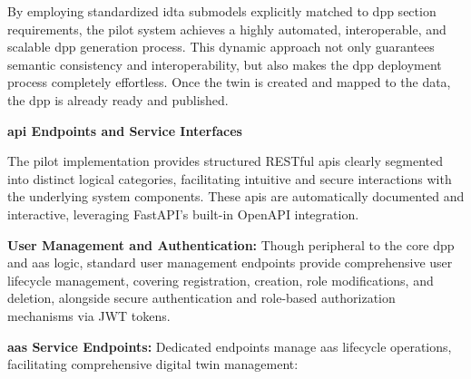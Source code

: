 By employing standardized \ac{idta} submodels explicitly matched to \ac{dpp} section requirements, the pilot system achieves a highly automated, interoperable, and scalable \ac{dpp} generation process. This dynamic approach not only guarantees semantic consistency and interoperability, but also makes the \ac{dpp} deployment process completely effortless. Once the twin is created and mapped to the data, the \ac{dpp} is already ready and published.

\textbf{\ac{api} Endpoints and Service Interfaces}

The pilot implementation provides structured RESTful \ac{api}s clearly segmented into distinct logical categories, facilitating intuitive and secure interactions with the underlying system components. These \ac{api}s are automatically documented and interactive, leveraging FastAPI’s built-in OpenAPI integration.

\textbf{User Management and Authentication:}
Though peripheral to the core \ac{dpp} and \ac{aas} logic, standard user management endpoints provide comprehensive user lifecycle management, covering registration, creation, role modifications, and deletion, alongside secure authentication and role-based authorization mechanisms via JWT tokens.

\textbf{\ac{aas} Service Endpoints:}
Dedicated endpoints manage \ac{aas} lifecycle operations, facilitating comprehensive digital twin management:

